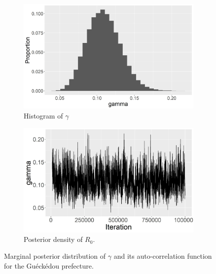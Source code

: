\documentclass[11pt]{article}
\begin{document}
	\begin{figure}
		\centering
		\begin{subfigure}[b]{0.45\textwidth}
			\centering
			\includegraphics[width=\textwidth]{E5_gamma_hist}
			\caption{Histogram of $\gamma$}
			\label{fig:E5_gamma_hist}
		\end{subfigure}
		\hfill
		\begin{subfigure}[b]{0.49\textwidth}
			\centering
			\includegraphics[width=\textwidth]{E5_gamma_tp}
			\caption{Posterior density of $R_0$.}
			\label{fig:density_R0}
		\end{subfigure}
		\caption{Marginal posterior distribution of $\gamma$ and its auto-correlation function for the Gu\'eck\'edou prefecture.}
		\label{fig:ebola}
	\end{figure}
	
\end{document}
